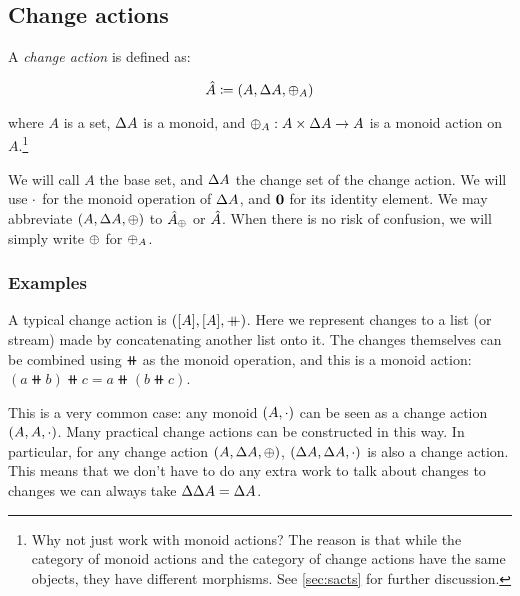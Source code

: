 \subsection{Change actions}
\label{sec:changeAction}

\begin{defn}
  A \emph{change action} is defined as:

  \begin{displaymath}
    \hat{A} \coloneqq (A,\Delta A,\oplus_A)
  \end{displaymath}

  where $A$ is a set, $\Delta A$ is a monoid, and $\oplus_A : A \times \Delta A \rightarrow A$ is a monoid action on $A$.\footnote{Why not
    just work with monoid actions? The reason is that while the category of
    monoid actions and the category of change actions have the same objects, they
  have different morphisms. See \cref{sec:sacts} for further discussion.}

  We will call $A$ the base set, and $\Delta A$ the change set of the change
  action. We will use $\cdot$ for the monoid operation of $\Delta A$, and
  $\mathbf{0}$ for its identity element. We may abbreviate $(A,\Delta A,\oplus)$ to $\hat{A}_\oplus$ or $\hat{A}$. When there is no risk of confusion, we will simply write $\oplus$ for $\oplus_A$.
\end{defn}

\subsubsection{Examples}
\label{sec:examples}

A typical change action is $([A],[A],\mathbin{+\mkern-10mu+})$. Here we represent changes
to a list (or stream) made by concatenating another list onto it. The changes
themselves can be combined using $\doubleplus$ as the monoid operation, and this
is a monoid action: $(a \doubleplus b) \doubleplus c = a \doubleplus \left( b \doubleplus c \right)$.

This is a very common case: any monoid $(A, \cdot)$ can be seen as a change action
$(A,A,\cdot)$. Many practical change actions
can be constructed in this way. In particular, for any change action $(A,\Delta A,\oplus)$,
$(\Delta A,\Delta A,\cdot)$ is also a change action. This means
that we don't have to do any extra work to talk about changes to changes \textemdash{} we can 
always take $\Delta \Delta A = \Delta A$.

